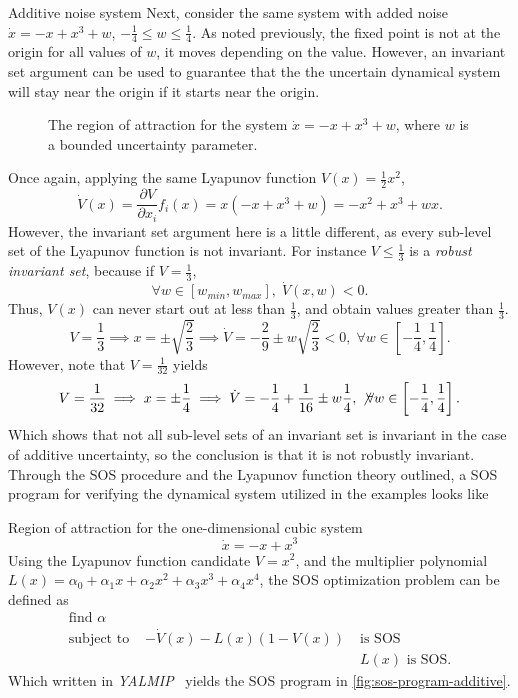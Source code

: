 \begin{example}{Additive noise system}
  Next, consider the same system with added noise \(\dot{x} = -x + x^3 + w\),
  \(-\frac{1}{4} \leq w \leq \frac{1}{4}\). As noted previously, the fixed point
  is not at the origin for all values of \(w\), it moves depending on the value.
  However, an invariant set argument can be used to guarantee that the the
  uncertain dynamical system will stay near the origin if it starts near the
  origin.
\end{example}

\begin{figure}
  \centering
  
  \caption{The region of attraction for the system \(\dot{x} = -x + x^3 + w\),
    where \(w\) is a bounded uncertainty parameter.}
\end{figure}

Once again, applying the same Lyapunov function \(V(x) = \frac{1}{2}x^2\),
\[
  \dot{V}(x) = \frac{\partial V}{\partial x_i} f_i(x) = x(-x + x^3 + w) = -x^2 +
  x^3 + wx.
\]
However, the invariant set argument here is a little different, as every
sub-level set of the Lyapunov function is not invariant. For instance \(V \leq
\frac{1}{3}\) is a \textit{robust invariant set}, because if \(V =
\frac{1}{3}\),
\[
  \forall w \in \left[ w_{min}, w_{max} \right], \; \dot{V}(x,w) < 0.
\]
Thus, \(V(x)\) can never start out at less than \(\frac{1}{3}\), and obtain
values greater than \(\frac{1}{3}\).
\[
  V = \frac{1}{3} \implies x = \pm \sqrt{\frac{2}{3}} \implies \dot{V} =
  -\frac{2}{9} \pm w \sqrt{\frac{2}{3}} < 0, \; \forall w \in \left[
    -\frac{1}{4}, \frac{1}{4} \right].
\]
However, note that \(V = \frac{1}{32}\) yields
\[
  V = \frac{1}{32} \implies x = \pm \frac{1}{4} \implies \dot{V} = -\frac{1}{4}
  + \frac{1}{16} \pm w\frac{1}{4}, \; \not \forall w \in \left[ -\frac{1}{4},
    \frac{1}{4} \right].
\]
Which shows that not all sub-level sets of an invariant set is invariant in the
case of additive uncertainty, so the conclusion is that it is not robustly
invariant. Through the \ac{SOS} procedure and the Lyapunov function theory
outlined, a \ac{SOS} program for verifying the dynamical system utilized in the
examples looks like

\begin{example}{Region of attraction for the one-dimensional cubic system}
  \[
    \dot{x} = -x + x^3
  \]
  Using the Lyapunov function candidate \(V = x^2\), and the multiplier
  polynomial \(L(x) = \alpha_0 + \alpha_1x + \alpha_2x^2 + \alpha_3x^3 +
  \alpha_4x^4\), the \ac{SOS} optimization problem can be defined as
  \begin{align*}
    \text{find } \alpha& \\
    \text{subject to }& -\dot{V}(x) - L(x)\left( 1 - V(x) \right) \; &\text{is SOS} \\
                       & &L(x) \text{ is SOS}.
  \end{align*}
  Which written in \textit{YALMIP}~\cite{Lofberg2004,Lofberg2009} yields the
  \ac{SOS} program in \cref{fig:sos-program-additive}.
\end{example}

